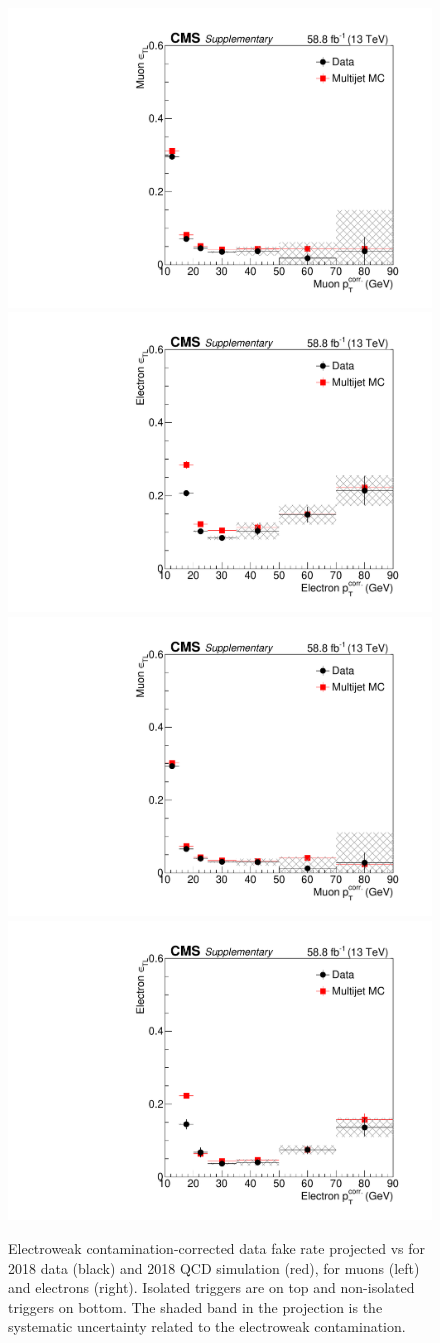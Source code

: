   \begin{figure}[!hbtp]
  \centering
  \includegraphics[width=.45\textwidth]{figs/ssan/fakerate/derivation/y2018/y2018_mu_1dfr_cone_LooseEMVA_IsoTrigs.pdf}
  \includegraphics[width=.45\textwidth]{figs/ssan/fakerate/derivation/y2018/y2018_el_1dfr_cone_LooseEMVA_IsoTrigs.pdf} \\
  \includegraphics[width=.45\textwidth]{figs/ssan/fakerate/derivation/y2018/y2018_mu_1dfr_cone_LooseEMVA.pdf}
  \includegraphics[width=.45\textwidth]{figs/ssan/fakerate/derivation/y2018/y2018_el_1dfr_cone_LooseEMVA.pdf}
  \caption{Electroweak contamination-corrected data fake rate projected vs \pt for 2018 data (black) and 2018 QCD simulation (red),
   for muons (left) and electrons (right). Isolated triggers are on top and non-isolated triggers on bottom.
      The shaded band in the projection is the systematic uncertainty related to the electroweak contamination.}
  \label{fig:QCDFRMuEle2018isoandnoniso}
  \end{figure}

